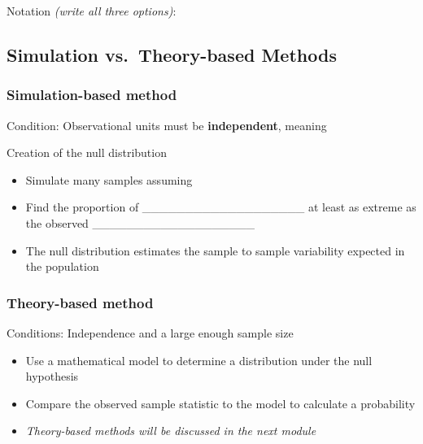 \documentclass[
]{report}
\providecommand{\tightlist}{%
  \setlength{\itemsep}{0pt}\setlength{\parskip}{0pt}}
\begin{document}
Notation \emph{(write all three options)}:

\vspace{0.6in}

\subsection*{Simulation vs.~Theory-based Methods}\label{simulation-vs.-theory-based-methods}

\subsubsection*{Simulation-based method}\label{simulation-based-method}

Condition: Observational units must be \textbf{independent}, meaning

\vspace{0.2in}


\newpage

Creation of the null distribution

\begin{itemize}
\tightlist
\item
  Simulate many samples assuming
\end{itemize}

\vspace{0.2in}

\begin{itemize}
\item
  Find the proportion of \_\_\_\_\_\_\_\_\_\_\_\_\_\_\_\_\_\_\_ at least as extreme as the observed \_\_\_\_\_\_\_\_\_\_\_\_\_\_\_\_\_\_\_
\item
  The null distribution estimates the sample to sample variability expected in the population
\end{itemize}


\subsubsection*{Theory-based method}\label{theory-based-method}

Conditions: Independence and a large enough sample size

\begin{itemize}
\item
  Use a mathematical model to determine a distribution under the null hypothesis
\item
  Compare the observed sample statistic to the model to calculate a probability
\item
  \emph{Theory-based methods will be discussed in the next module}
\end{itemize}
\end{document}
